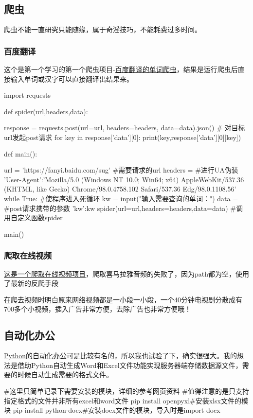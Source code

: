 \subsection{爬虫}
爬虫不能一直研究只能随缘，属于奇淫技巧，不能耗费过多时间。
\subsubsection{百度翻译}
这个是第一个学习的第一个爬虫项目-\href{https://blog.csdn.net/m0_58378947/article/details/123905684?spm=1001.2014.3001.5506}{百度翻译的单词爬虫}，结果是运行爬虫后直接输入单词或汉字可以直接翻译出结果来。
\begin{shell}
import requests

def spider(url,headers,data):

    response = requests.post(url=url, headers=headers, data=data).json()  # 对目标url发起post请求
    for key in response['data'][0]:
        print(key,response['data'][0][key])

def main():

    url = 'https://fanyi.baidu.com/sug'  #需要请求的url
    headers = {  #进行UA伪装
        'User-Agent':'Mozilla/5.0 (Windows NT 10.0; Win64; x64) AppleWebKit/537.36 (KHTML, like Gecko) Chrome/98.0.4758.102 Safari/537.36 Edg/98.0.1108.56'
    }
    while True:  #使程序进入死循环
        kw = input("输入需要查询的单词：")
        data = {     #post请求携带的参数
            'kw':kw
        }
        spider(url=url,headers=headers,data=data)  #调用自定义函数spider

main()
\end{shell}
\subsubsection{爬取在线视频}
\href{https://blog.csdn.net/u011223449/article/details/136110053}{这是一个爬取在线视频项目}，爬取喜马拉雅音频的失败了，因为path都为空，使用了最新的反爬手段

在爬去视频时明白原来网络视频都是一小段一小段，一个40分钟电视剧分散成有700多个小视频，插入广告非常方便，去除广告也非常方便哦！
\subsection{自动化办公}
\href{https://blog.csdn.net/weixin_41261833/article/details/106028038?spm=1001.2014.3001.5506}{Python的自动化办公}可是比较有名的，所以我也试验了下，确实很强大。我的想法是借助Python自动生成Word和Excel文件功能实现服务器端存储数据源文件，需要的时候自动生成需要的格式文件。
\begin{shell}
#这里只简单记录下需要安装的模块，详细的参考网页资料
#值得注意的是只支持指定格式的文件并非所有excel和word文件
pip install openpyxl#安装xlsx文件的模块
pip install python-docx#安装docx文件的模块，导入时是import docx
\end{shell}

